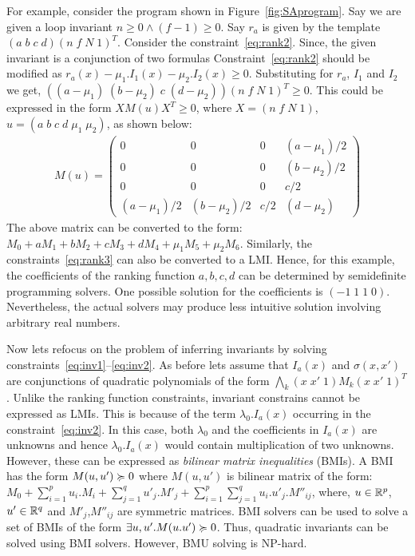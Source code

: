 For example, consider the program shown in Figure~\ref{fig:SAprogram}.
Say we are given a loop invariant $n \ge 0 \wedge (f-1) \ge 0$.
Say $r_a$ is given by the template $(a \; b \; c \; d)(n \; f \; N \; 1)^T$. 
Consider the constraint~\ref{eq:rank2}. Since, the given invariant 
is a conjunction of two formulas Constraint~\ref{eq:rank2} should be modified as $r_a(x) - \mu_1.I_1(x)- \mu_2.I_2(x) \ge 0$. 
Substituting for $r_a$, $I_1$ and $I_2$ we get,
$((a- \mu_1) \; (b - \mu_2) \; c \; (d-\mu_2))(n \; f \; N \; 1)^T \ge 0$.
This could be expressed in the form $X M(u) X^T \ge 0$, where 
$X=(n \; f \; N \; 1)$, $u = (a \; b \; c \; d \; \mu_1 \; \mu_2)$, 
as shown below:
%
\begin{align*}
M(u) = 
\left( \begin{array}{cccc} 
0 & 0 & 0 & (a- \mu_1)/2 \\
0 & 0 & 0 & (b- \mu_2)/2 \\
0 & 0 & 0 & c/2 \\
(a- \mu_1)/2 & (b- \mu_2)/2 & c/2 & (d-\mu_2) 
\end{array} \right)
\end{align*}
%
The above matrix can be converted to the form: 
$M_0 + a M_1 + b M_2 + c M_3 + d M_4 + \mu_1 M_5 + \mu_2 M_6$.
Similarly, the constraints~\ref{eq:rank3} can also be converted to a LMI.
Hence, for this example, the coefficients of the ranking function $a,b,c,d$
can be determined by semidefinite programming solvers.
One possible solution for the coefficients is $(-1 \; 1 \; 1 \; 0)$. Nevertheless,
the actual solvers may produce less intuitive solution involving arbitrary real numbers.

Now lets refocus on the problem of inferring invariants by solving constraints~\ref{eq:inv1}--\ref{eq:inv2}. As before lets assume that
$I_a(x)$ and $\sigma(x,x')$ are conjunctions of quadratic polynomials 
of the form $\bigwedge_k (x \; x' \; 1) M_k (x \; x' \; 1)^T$.
Unlike the ranking function constraints, invariant constrains cannot be 
expressed as LMIs. This is because of the term $\lambda_0.I_a(x)$ occurring
in the constraint~\ref{eq:inv2}. In this case, both $\lambda_0$ and the 
coefficients in $I_a(x)$ are unknowns and hence $\lambda_0.I_a(x)$ would contain
multiplication of two unknowns. However, these can be expressed as \emph{bilinear matrix inequalities} (BMIs). A BMI has the form $M(u,u') \succcurlyeq 0$ where $M(u,u')$
is bilinear matrix of the form: 
$M_0 + \sum \limits_{i=1}^{p} u_i.M_i + \sum \limits_{j=1}^{q} u'_j.M'_j + \sum \limits_{i=1}^{p} \sum \limits_{j=1}^{q} u_i.u'_j.M''_{ij}$,
where, $u \in \mathbb{R}^p$, $u' \in \mathbb{R}^q$ and $M'_j$,$M''_{ij}$ are symmetric matrices. BMI solvers can be used to solve a set of BMIs of the form $\exists u,u'. M(u.u') \succcurlyeq 0$. Thus, quadratic invariants can be solved using BMI solvers.
However, BMU solving is NP-hard.

